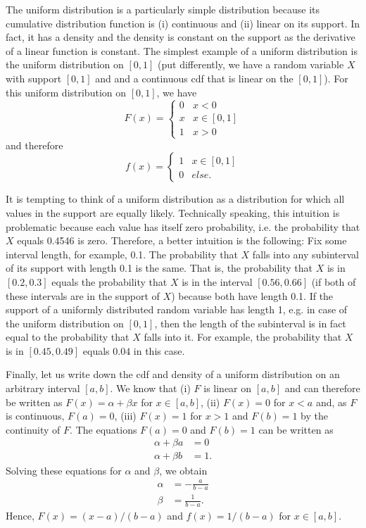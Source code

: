 \documentclass[a4paper,12pt]{article}
\theoremstyle{plain}
\begin{document}
The uniform distribution is a particularly simple distribution because its cumulative distribution function is (i) continuous and (ii) linear on its support. In fact, it has a density and the density is constant on the support as the derivative of a linear function is constant. The simplest example of a uniform distribution is the uniform distribution on $[0,1]$ (put differently, we have a random variable $X$ with support $[0,1]$ and and a continuous cdf that is linear on the $[0,1]$). For this uniform distribution on $[0,1]$, we have
$$F(x)=
\begin{cases}
  0 & x<0\\
  x & x\in[0,1]\\
  1 &x>0
\end{cases}$$
and therefore
$$f(x)=
\begin{cases}
  1 & x\in[0,1]\\
  0 & else.
\end{cases}$$

It is tempting to think of a uniform distribution as a distribution for which all values in the support are equally likely. Technically speaking, this intuition is problematic because each value has itself zero probability, i.e. the probability that $X$ equals 0.4546 is zero. Therefore, a better intuition is the following: Fix some interval length, for example, 0.1. The probability that $X$ falls into any subinterval of its support with length 0.1 is the same. That is, the probability that $X$ is in $[0.2,0.3]$ equals the probability that $X$ is in the interval $[0.56,0.66]$ (if both of these intervals are in the support of $X$) because both have length 0.1. If the support of a uniformly distributed random variable has length 1, e.g. in case of the uniform distribution on $[0,1]$, then the length of the subinterval is in fact equal to the probability that $X$ falls into it. For example, the probability that $X$ is in $[0.45,0.49]$ equals $0.04$ in this case.

Finally, let us write down the cdf and density of a uniform distribution on an arbitrary interval $[a,b]$. We know that (i) $F$ is linear on $[a,b]$ and can therefore be written as $F(x)=\alpha+\beta x$ for $x\in[a,b]$, (ii) $F(x)=0$ for $x<a$ and, as $F$ is continuous, $F(a)=0$, (iii) $F(x)=1$ for $x>1$ and $F(b)=1$ by the continuity of $F$. The equations $F(a)=0$ and $F(b)=1$ can be written as
\begin{align*}
  \alpha+\beta a&=0\\
  \alpha+\beta b&=1.
\end{align*}
Solving these equations for $\alpha$ and $\beta$, we obtain
\begin{align*}
  \alpha&=-\frac{a}{b-a}\\
  \beta&=\frac{1}{b-a}.        
\end{align*}
Hence, $F(x)=(x-a)/(b-a)$ and $f(x)=1/(b-a)$ for $x\in[a,b]$.
\end{document}

